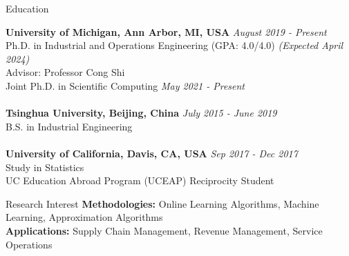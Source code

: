 \documentclass{resume}
\begin{document}

\begin{rSection}{Education}

{\bf University of Michigan, Ann Arbor, MI, USA} \hfill {\em August 2019 - Present} 
\\ Ph.D. in Industrial and Operations Engineering (GPA: 4.0/4.0) \hfill {\em (Expected April 2024) }
\\Advisor: Professor Cong Shi
\\Joint Ph.D. in Scientific Computing \hfill {\em May 2021 - Present} \\
\\{\bf Tsinghua University, Beijing, China} \hfill {\em July 2015 - June 2019} 
\\ B.S. in Industrial Engineering\\
\\{\bf University of California, Davis, CA, USA} \hfill {\em Sep 2017 - Dec 2017} \\Study in Statistics
\\ UC Education Abroad Program (UCEAP) Reciprocity Student

\end{rSection}

\begin{rSection}{Research Interest}
 {\bf Methodologies: } Online Learning Algorithms, Machine Learning, Approximation Algorithms\\
 {\bf Applications: } Supply Chain Management, Revenue Management, Service Operations
\end{rSection}
\end{document}
